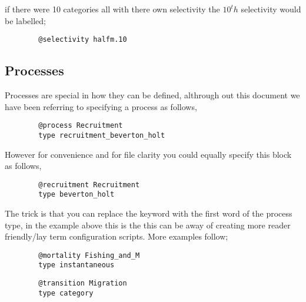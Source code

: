 if there were 10 categories all with there own selectivity the $10^th$ selectivity would be labelled;

{\small{\begin{verbatim}
		@selectivity halfm.10
		\end{verbatim}}}


\subsection{Processes}
Processes are special in how they can be defined, althrough out this document we have been referring to specifying a process as follows,

{\small{\begin{verbatim}
		@process Recruitment
		type recruitment_beverton_holt
		\end{verbatim}}}
However for convenience and for file clarity you could equally specify this block as follows,
{\small{\begin{verbatim}
		@recruitment Recruitment
		type beverton_holt
		\end{verbatim}}}

The trick is that you can replace the keyword  with the first word of the process type, in the example above this is the  this can be away of creating more reader friendly/lay term configuration scripts. More examples follow;

{\small{\begin{verbatim}
		@mortality Fishing_and_M
		type instantaneous
		\end{verbatim}}}

{\small{\begin{verbatim}
		@transition Migration
		type category
		\end{verbatim}}}
	
\subsection{\label{example1}}

